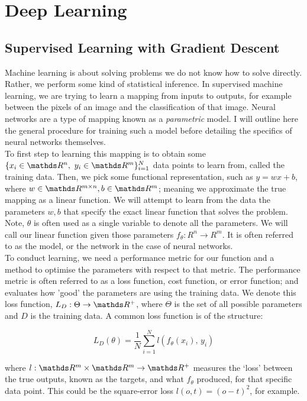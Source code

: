\section{Deep Learning}
\subsection{Supervised Learning with Gradient Descent}
Machine learning is about solving problems we do not know how to solve directly. Rather, we perform some kind of statistical inference. In supervised machine learning, we are trying to learn a mapping from inputs to outputs, for example between the pixels of an image and the classification of that image. Neural networks are a type of mapping known as a \textit{parametric} model. I will outline here the general procedure for training such a model before detailing the specifics of neural networks themselves. \\

To first step to learning this mapping is to obtain some \(\{x_i \in \R^n, \ y_i \in \R^m\}_{i=1}^N\) data points to learn from, called the training data. Then, we pick some functional representation, such as \(y = wx + b\), where \(w \in \R^{m \times n}, b \in \R^m\); meaning we approximate the true mapping as a linear function. We will attempt to learn from the data the parameters \(w, b\) that specify the exact linear function that solves the problem. Note, \(\theta\) is often used as a single variable to denote all the parameters. We will call our linear function given those parameters \(f_\theta : R^n \rightarrow R^m\). It is often referred to as the model, or the network in the case of neural networks. \\

To conduct learning, we need a performance metric for our function and a method to optimise the parameters with respect to that metric. The performance metric is often referred to as a loss function, cost function, or error function; and evaluates how 'good' the parameters are using the training data. We denote this loss function, \(L_D : \Theta \rightarrow \R^+\), where \(\Theta\) is the set of all possible parameters and \(D\) is the training data. A common loss function is of the structure:

\begin{equation*}
    L_D(\theta) = \frac{1}{N}\sum_{i=1}^N l(f_\theta(x_i),\, y_i)
\end{equation*}

where \(l : \R^m\times\R^m \rightarrow \R^+\) measures the `loss' between the true outputs, known as the targets, and what \(f_{\theta}\) produced, for that specific data point. This could be the square-error loss \(l(o, t) = (o-t)^2\), for example. \\

